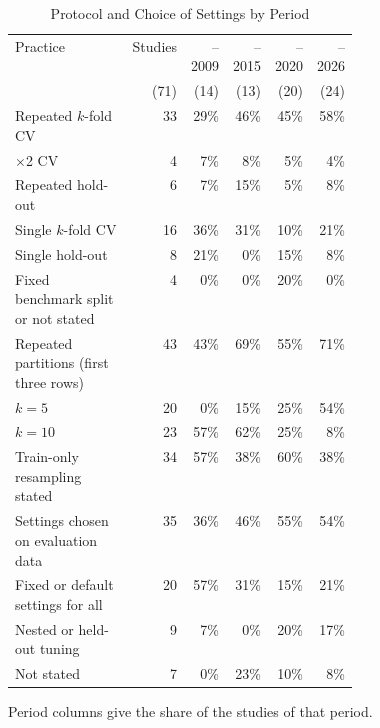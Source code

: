 \begin{table}[t]
  \caption{Protocol and Choice of Settings by Period}
  \label{tab:empirical-protocol-era}
  \footnotesize
  \setlength{\tabcolsep}{4pt}
  \begin{tabular}{@{}>{\raggedright\arraybackslash}p{0.4\linewidth}rrrrr@{}}
    \toprule
    Practice & Studies & --2009 & --2015 & --2020 & --2026\\
    & (71) & (14) & (13) & (20) & (24)\\
    \midrule
    Repeated $k$-fold CV & 33 & 29\% & 46\% & 45\% & 58\%\\
    5$\times$2 CV & 4 & 7\% & 8\% & 5\% & 4\%\\
    Repeated hold-out & 6 & 7\% & 15\% & 5\% & 8\%\\
    Single $k$-fold CV & 16 & 36\% & 31\% & 10\% & 21\%\\
    Single hold-out & 8 & 21\% & 0\% & 15\% & 8\%\\
    Fixed benchmark split or not stated & 4 & 0\% & 0\% & 20\% & 0\%\\
    \midrule
    Repeated partitions (first three rows) & 43 & 43\% & 69\% & 55\% & 71\%\\
    $k = 5$ & 20 & 0\% & 15\% & 25\% & 54\%\\
    $k = 10$ & 23 & 57\% & 62\% & 25\% & 8\%\\
    Train-only resampling stated & 34 & 57\% & 38\% & 60\% & 38\%\\
    \midrule
    Settings chosen on evaluation data & 35 & 36\% & 46\% & 55\% & 54\%\\
    Fixed or default settings for all & 20 & 57\% & 31\% & 15\% & 21\%\\
    Nested or held-out tuning & 9 & 7\% & 0\% & 20\% & 17\%\\
    Not stated & 7 & 0\% & 23\% & 10\% & 8\%\\
    \bottomrule
  \end{tabular}
  \par\smallskip\raggedright\scriptsize Period columns give the share of the studies of that period.
\end{table}

